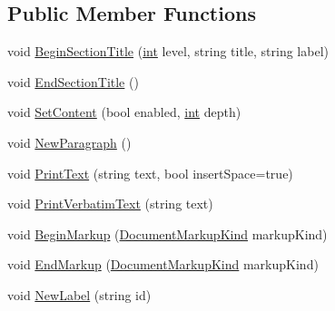 \subsection*{Public Member Functions}
\begin{DoxyCompactItemize}
\item 
void \hyperlink{interface_software_engineering_tools_1_1_documentation_1_1_i_document_generator_a8f4c05966722692fccdd777204393380}{Begin\+Section\+Title} (\hyperlink{namespace_software_engineering_tools_1_1_documentation_a4a8017aa254d1d05b03db5132b7dd3a7afa7153f7ed1cb6c0fcf2ffb2fac21748}{int} level, string title, string label)
\item 
void \hyperlink{interface_software_engineering_tools_1_1_documentation_1_1_i_document_generator_ad55a14f9d43ac04deeca2dd038f0d0f3}{End\+Section\+Title} ()
\item 
void \hyperlink{interface_software_engineering_tools_1_1_documentation_1_1_i_document_generator_afa8596c83bf0870cba169c48c8072a50}{Set\+Content} (bool enabled, \hyperlink{namespace_software_engineering_tools_1_1_documentation_a4a8017aa254d1d05b03db5132b7dd3a7afa7153f7ed1cb6c0fcf2ffb2fac21748}{int} depth)
\item 
void \hyperlink{interface_software_engineering_tools_1_1_documentation_1_1_i_document_generator_a7a72bc7b1aa079a13a858377a17e6f36}{New\+Paragraph} ()
\item 
void \hyperlink{interface_software_engineering_tools_1_1_documentation_1_1_i_document_generator_a7f9eb01667e631ecb1b682db6caabbf7}{Print\+Text} (string text, bool insert\+Space=true)
\item 
void \hyperlink{interface_software_engineering_tools_1_1_documentation_1_1_i_document_generator_ae34962fbf96a9e96668dcc2c7782db5f}{Print\+Verbatim\+Text} (string text)
\item 
void \hyperlink{interface_software_engineering_tools_1_1_documentation_1_1_i_document_generator_a3cc12daff5435cee9b1ab979cf16fa02}{Begin\+Markup} (\hyperlink{namespace_software_engineering_tools_1_1_documentation_a4eed17ca0ed06a8b62b953b063f857d9}{Document\+Markup\+Kind} markup\+Kind)
\item 
void \hyperlink{interface_software_engineering_tools_1_1_documentation_1_1_i_document_generator_a4d9530cd6d8301f556425393f2548975}{End\+Markup} (\hyperlink{namespace_software_engineering_tools_1_1_documentation_a4eed17ca0ed06a8b62b953b063f857d9}{Document\+Markup\+Kind} markup\+Kind)
\item 
void \hyperlink{interface_software_engineering_tools_1_1_documentation_1_1_i_document_generator_ad185c68d20bd69fc2ca73c3bae2c40b1}{New\+Label} (string id)

\end{DoxyCompactItemize}
